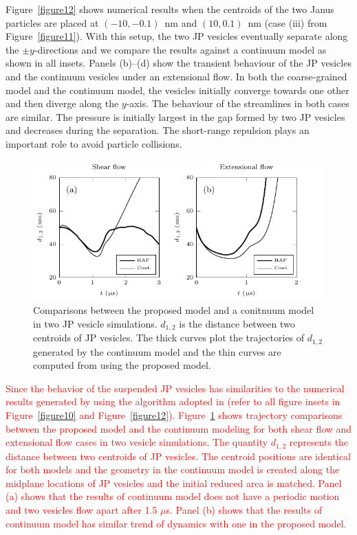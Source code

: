 \documentclass[lineno]{jfm}
\newcommand{\ReviewerOne}[1]{\textcolor{red}{#1}}
\begin{document}
Figure~\ref{figure12} shows numerical results when the centroids of the
two Janus particles are placed at $(-10,-0.1)$~nm and $(10,0.1)$~nm
(case (iii) from Figure~\ref{figure11}). With this setup, the two JP
vesicles eventually separate along the $\pm y$-directions and we compare
the results against a continuum model as shown in all insets. Panels
(b)--(d) show the transient behaviour of the JP vesicles and the
continuum vesicles under an extensional flow. In both the coarse-grained
model and the continuum model, the vesicles initially converge towards
one other and then diverge along the $y$-axis. The behaviour of the
streamlines in both cases are similar. The pressure is initially largest
in the gap formed by two JP vesicles and decreases during the
separation. The short-range repulsion plays an important role to avoid
particle collisions.




\begin{figure}
  \centering
  \includegraphics[width=\textwidth]{Figure13_Wrapper.pdf}
  \caption{\label{figure13} Comparisons between the proposed model and a conitnuum model in 
  two JP vesicle simulations. 
  $d_{1,2}$ is the distance between two centroids of JP vesicles. The thick curves plot the trajectories
  of $d_{1,2}$ generated by the continuum model and the thin curves are computed from using
  the proposed model.}
\end{figure}


\ReviewerOne{Since the behavior of the suspended JP vesicles has similarities to the numerical 
results generated by using the algorithm adopted in \cite{qua-vee-you2019} (refer to all figure
insets in Figure~\ref{figure10} and Figure~\ref{figure12}). Figure~\ref{figure13} shows 
trajectory comparisons between the proposed model and the continuum modeling for both 
shear flow and extensional flow cases in two vesicle simulations. The quantity $d_{1,2}$
represents the distance between two centroids of JP vesicles. The centroid positions are 
identical for both models and the geometry in the continuum model is created along the 
midplane locations of JP vesicles and the initial reduced area is matched. Panel (a) shows that 
the results of continuum model does not have a periodic motion and two vesicles flow apart 
after 1.5 $\mu$s. Panel (b) shows that the results of continuum model has similar trend of
dynamics with one in the proposed model.}
\end{document}
